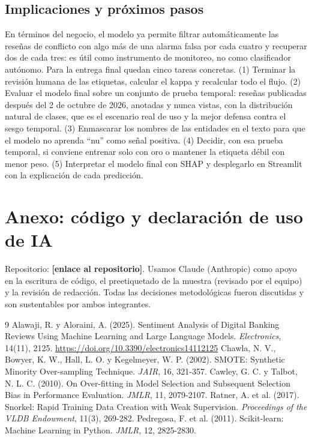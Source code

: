 \documentclass[11pt,a4paper]{article}
\newcommand{\pend}[1]{\textcolor{pendiente}{\textbf{[#1]}}}
\begin{document}
\subsection{Implicaciones y próximos pasos}
En términos del negocio, el modelo ya permite filtrar automáticamente las reseñas de conflicto
con algo más de una alarma falsa por cada cuatro y recuperar dos de cada tres: es útil como instrumento de
monitoreo, no como clasificador autónomo. Para la entrega final quedan cinco tareas concretas.
(1) Terminar la revisión humana de las etiquetas, calcular el kappa y recalcular todo el flujo.
(2) Evaluar el modelo final sobre un conjunto de prueba temporal: reseñas publicadas después del 2
de octubre de 2026, anotadas y nunca vistas, con la distribución natural de clases, que es el
escenario real de uso y la mejor defensa contra el sesgo temporal. (3) Enmascarar los nombres de
las entidades en el texto para que el modelo no aprenda ``nu'' como señal positiva. (4) Decidir,
con esa prueba temporal, si conviene entrenar solo con oro o mantener la etiqueta débil con menor
peso. (5) Interpretar el modelo final con SHAP y desplegarlo en Streamlit con la explicación de
cada predicción.



\section*{Anexo: código y declaración de uso de IA}
\small
Repositorio: \pend{enlace al repositorio}. Usamos Claude (Anthropic) como apoyo en la escritura de
código, el preetiquetado de la muestra (revisado por el equipo) y la revisión de redacción. Todas
las decisiones metodológicas fueron discutidas y son sustentables por ambos integrantes.

\begin{thebibliography}{9}\small
{} Alawaji, R. y Aloraini, A. (2025). Sentiment Analysis of Digital Banking
Reviews Using Machine Learning and Large Language Models. \textit{Electronics}, 14(11), 2125.
\url{https://doi.org/10.3390/electronics14112125}
 Chawla, N. V., Bowyer, K. W., Hall, L. O. y Kegelmeyer, W. P. (2002). SMOTE:
Synthetic Minority Over-sampling Technique. \textit{JAIR}, 16, 321-357.
 Cawley, G. C. y Talbot, N. L. C. (2010). On Over-fitting in Model Selection and
Subsequent Selection Bias in Performance Evaluation. \textit{JMLR}, 11, 2079-2107.
 Ratner, A. et al. (2017). Snorkel: Rapid Training Data Creation with Weak
Supervision. \textit{Proceedings of the VLDB Endowment}, 11(3), 269-282.
 Pedregosa, F. et al. (2011). Scikit-learn: Machine Learning in Python.
\textit{JMLR}, 12, 2825-2830.
\end{thebibliography}
\end{document}
